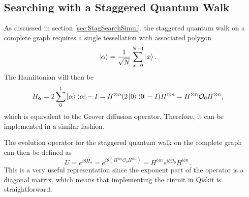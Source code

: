 \documentclass[../../dissertation.tex]{subfiles}
\begin{document}
\subsection{Searching with a Staggered Quantum Walk}
As discussed in section \ref{sec:StagSearchSimul}, the staggered quantum walk
on a complete graph requires a single tessellation with associated polygon
\begin{equation}
	\ket{\alpha} = \frac{1}{\sqrt{N}} \sum_{x=0}^{N-1} \ket{x}.
\end{equation}
The Hamiltonian will then be 
\begin{equation}
	H_\alpha = 2\sum_0^1\ket{\alpha}\bra{\alpha} - I = H^{\otimes n} (2\ket{0}\bra{0} - I) H^{\otimes n} = H^{\otimes n} \mathcal{O}_0 H^{\otimes n},
\end{equation}
which is equivalent to the Grover diffusion operator. Therefore, it can be
implemented in a similar fashion. \par

The evolution operator for the staggered quantum walk on the complete graph can
then be defined as 
\begin{equation}
	U = e^{i\theta H_\alpha} = e^{i\theta(H^{\otimes n} \mathcal{O}_0 H^{\otimes n})} = H^{\otimes n} e^{i\theta\mathcal{O}_0} H^{\otimes n}.
	\label{eq:unmodEvolOperatorStagSearch}
\end{equation}
This is a very useful representation since the exponent part of the operator is
a diagonal matrix, which means that implementing the circuit in Qiskit is
straightforward.\par 
\end{document}
